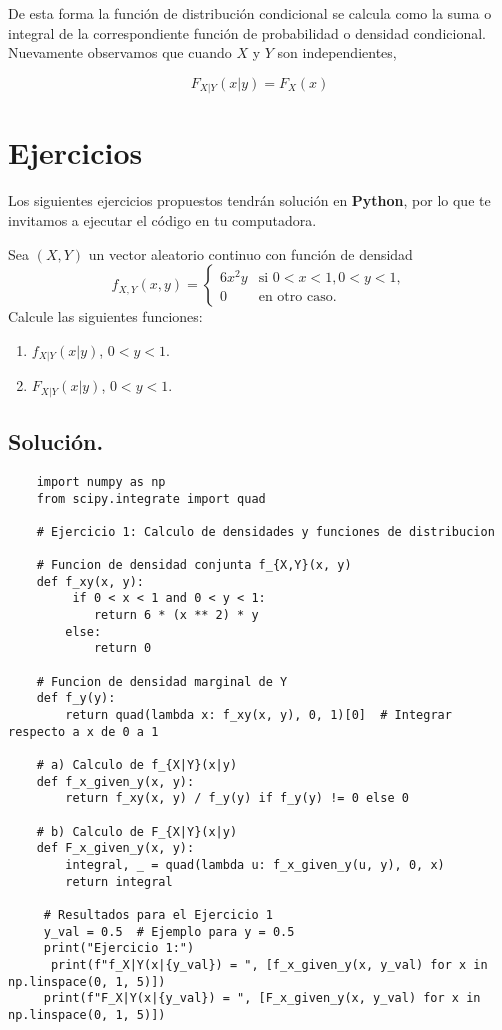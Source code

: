 \documentclass[a4paper,12pt]{article}
\begin{document}
De esta forma la función de distribución condicional se calcula como la suma o integral de la correspondiente función de probabilidad o densidad condicional. Nuevamente observamos que cuando $X$ y $Y$ son independientes,

    \begin{equation*}
         F_{X|Y}(x|y) =  F_{X}(x)
    \end{equation*}

\section*{Ejercicios}
    Los siguientes ejercicios propuestos tendrán solución en \textbf{Python}, por lo que te invitamos a ejecutar el código en tu computadora.

    \begin{example}
         Sea $(X,Y)$ un vector aleatorio continuo con función de densidad
            \[
            f_{X,Y}(x,y) = \begin{cases}
            6x^2y & \text{si } 0 < x < 1, 0 < y < 1, \\
            0 & \text{en otro caso.}
            \end{cases}
            \]
            Calcule las siguientes funciones:
            \begin{enumerate}[label=\alph*)]  
            \item $f_{X|Y}(x|y)$, $0 < y < 1$.
                \item $F_{X|Y}(x|y)$, $0 < y < 1$.
        \end{enumerate}
    \end{example}

    \subsection*{Solución.}
    \begin{lstlisting}
    import numpy as np
    from scipy.integrate import quad
        
    # Ejercicio 1: Calculo de densidades y funciones de distribucion
        
    # Funcion de densidad conjunta f_{X,Y}(x, y)
    def f_xy(x, y):
         if 0 < x < 1 and 0 < y < 1:
            return 6 * (x ** 2) * y
        else:
            return 0
        
    # Funcion de densidad marginal de Y
    def f_y(y):
        return quad(lambda x: f_xy(x, y), 0, 1)[0]  # Integrar respecto a x de 0 a 1
        
    # a) Calculo de f_{X|Y}(x|y)
    def f_x_given_y(x, y):
        return f_xy(x, y) / f_y(y) if f_y(y) != 0 else 0
        
    # b) Calculo de F_{X|Y}(x|y)
    def F_x_given_y(x, y):
        integral, _ = quad(lambda u: f_x_given_y(u, y), 0, x)
        return integral
    
     # Resultados para el Ejercicio 1
     y_val = 0.5  # Ejemplo para y = 0.5
     print("Ejercicio 1:")
      print(f"f_X|Y(x|{y_val}) = ", [f_x_given_y(x, y_val) for x in np.linspace(0, 1, 5)])
     print(f"F_X|Y(x|{y_val}) = ", [F_x_given_y(x, y_val) for x in np.linspace(0, 1, 5)])
    \end{lstlisting}
\end{document}
